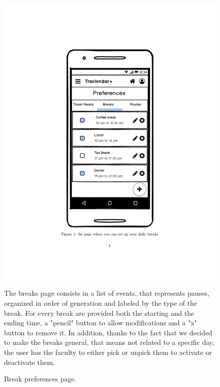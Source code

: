 		\begin{figure}
		\centering
		\includegraphics[width=0.6\linewidth]{mockups/PreferencesBreaks}
		\caption{Break preferences page.}
		\label{fig:preferencesbreaks}
		\begin{center}
			The breaks page consists in a list of events, that represents pauses, organized in order of generation and labeled by the type of the break. For every break are provided both the starting and the ending time, a "pencil" button to allow modifications and a "x" button to remove it. In addition, thanks to the fact that we decided to make the breaks general, that means not related to a specific day, the user has the faculty to either pick or unpick them to activate or deactivate them. 
		\end{center}
		\begin{center}
			
		\end{center}
	\end{figure}
	
